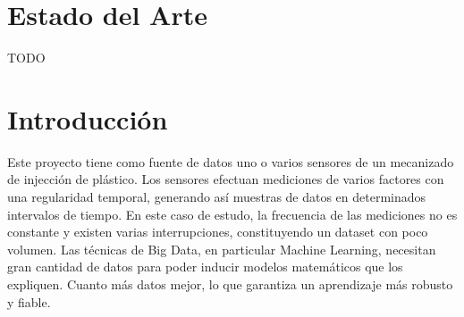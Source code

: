 \documentclass[11pt,spanish,listoffigures,listoftables]{tfgetsinf}
\begin{document}

\chapter{Estado del Arte}

TODO


\mainmatter



\chapter{Introducci\'on}

Este proyecto tiene como fuente de datos uno o varios sensores de un mecanizado de injección de plástico. Los sensores efectuan mediciones de varios factores con una regularidad temporal, generando así muestras de datos en determinados intervalos de tiempo. En este caso de estudo, la frecuencia de las mediciones no es constante y existen varias interrupciones, constituyendo un dataset con poco volumen. Las técnicas de Big Data, en particular Machine Learning, necesitan gran cantidad de datos para poder inducir modelos matemáticos que los expliquen. Cuanto más datos mejor, lo que garantiza un aprendizaje más robusto y fiable.
\end{document}

